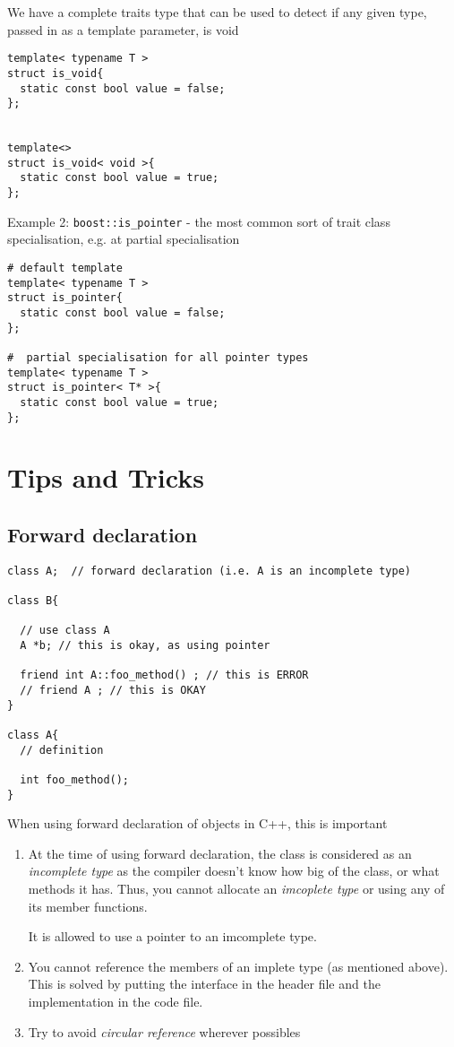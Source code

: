 We have a complete traits type that can be used to detect if any given type,
passed in as a template parameter, is void

\begin{verbatim}
template< typename T > 
struct is_void{ 
  static const bool value = false;
};


template<> 
struct is_void< void >{ 
  static const bool value = true; 
};
\end{verbatim}

Example 2: \verb!boost::is_pointer!
- the most common sort of trait class specialisation, e.g. at partial specialisation

\begin{verbatim}
# default template
template< typename T > 
struct is_pointer{ 
  static const bool value = false; 
};

#  partial specialisation for all pointer types 
template< typename T > 
struct is_pointer< T* >{ 
  static const bool value = true; 
};
\end{verbatim}

\section{Tips and Tricks}

\subsection{Forward declaration}
\label{sec:forward_declaration}

\begin{verbatim}
class A;  // forward declaration (i.e. A is an incomplete type)

class B{

  // use class A
  A *b; // this is okay, as using pointer
  
  friend int A::foo_method() ; // this is ERROR
  // friend A ; // this is OKAY
}

class A{
  // definition
  
  int foo_method();
}

\end{verbatim}

When using forward declaration of objects in C++, this is important
\begin{enumerate}
  \item At the time of using forward declaration, the class is considered as
  an {\it incomplete type} as the compiler doesn't know how big of the class, or
  what methods it has. Thus, you cannot allocate an {\it imcoplete type} or
  using any of its member functions. 
  
It is allowed to use a pointer to an imcomplete type.

  \item You cannot reference the members of an implete type (as mentioned
  above). This is solved by putting the interface in the header file and the
  implementation in the code file.
  
  \item Try to avoid {\it circular reference} wherever possibles
\end{enumerate}

